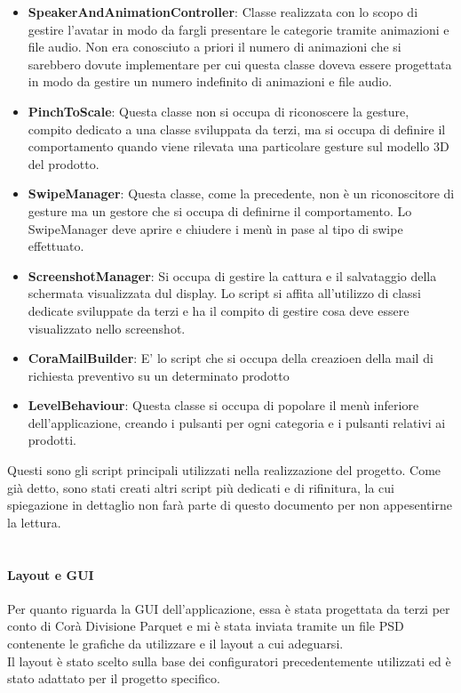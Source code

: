 \begin{itemize}
	\item \textbf{SpeakerAndAnimationController}: Classe realizzata con lo scopo di gestire l'avatar in modo da fargli presentare le categorie tramite animazioni e file audio. Non era conosciuto a priori il numero di animazioni che si sarebbero dovute implementare per cui questa classe doveva essere progettata in modo da gestire un numero indefinito di animazioni e file audio.
	
	\item \textbf{PinchToScale}: Questa classe non si occupa di riconoscere la gesture, compito dedicato a una classe sviluppata da terzi, ma si occupa di definire il comportamento quando viene rilevata una particolare gesture sul modello 3D del prodotto.
	
	\item \textbf{SwipeManager}: Questa classe, come la precedente, non \`e un riconoscitore di gesture ma un gestore che si occupa di definirne il comportamento. Lo SwipeManager deve aprire e chiudere i men\`u in pase al tipo di swipe effettuato.
	
	\item \textbf{ScreenshotManager}: Si occupa di gestire la cattura e il salvataggio della schermata visualizzata dul display. Lo script si affita all'utilizzo di classi dedicate sviluppate da terzi e ha il compito di gestire cosa deve essere visualizzato nello screenshot.
	
	\item \textbf{CoraMailBuilder}: E' lo script che si occupa della creazioen della mail di richiesta preventivo su un determinato prodotto
	
	\item \textbf{LevelBehaviour}: Questa classe si occupa di popolare il men\`u inferiore dell'applicazione, creando i pulsanti per ogni categoria e i pulsanti relativi ai prodotti.
\end{itemize}

Questi sono gli script principali utilizzati nella realizzazione del progetto. Come gi\`a detto, sono stati creati altri script pi\`u dedicati e di rifinitura, la cui spiegazione in dettaglio non far\`a parte di questo documento per non appesentirne la lettura.\\\\

\paragraph{Layout e GUI}
Per quanto riguarda la GUI dell'applicazione, essa \`e stata progettata da terzi per conto di Cor\`a Divisione Parquet e mi \`e stata inviata tramite un file PSD contenente le grafiche da utilizzare e il layout a cui adeguarsi.\\
Il layout \`e stato scelto sulla base dei configuratori precedentemente utilizzati ed \`e stato adattato per il progetto specifico.

